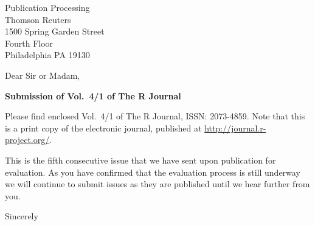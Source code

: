 \documentclass[11pt]{letter}
\begin{document}
\address{12 rue Saint Denis\\69500 Bron\\France\\[12pt]Tel: +33(0)4 72 73 84 46\\Eml: Martyn.Plummer@R-project.org}
\signature{Martyn Plummer\\\textbf{Editor in Chief\\The R Journal}}
\def\today{11 July 2012}

\begin{letter}{Publication Processing \\
      Thomson Reuters\\
      1500 Spring Garden Street\\Fourth Floor\\
      Philadelphia PA 19130}

\opening{Dear Sir or Madam,}

\textbf{Submission of Vol.\ 4/1 of The R Journal}

Please find enclosed Vol.\ 4/1 of The R Journal, ISSN: 2073-4859. Note
that this is a print copy of the electronic journal, published at
\url{http://journal.r-project.org/}.

This is the fifth consecutive issue that we have sent upon publication
for evaluation. As you have confirmed that the evaluation process is
still underway we will continue to submit issues as they are published
until we hear further from you.


\closing{Sincerely}

\end{letter}
\end{document}
